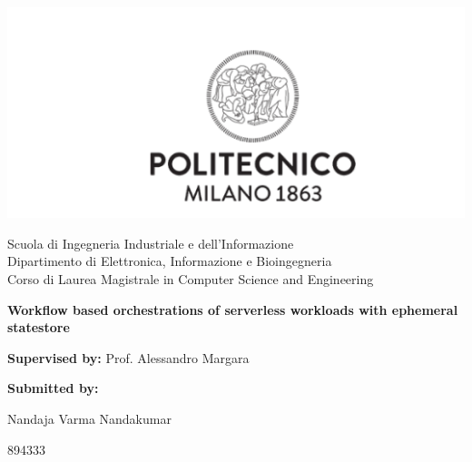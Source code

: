 \documentclass[12pt,titlepage]{article}
\date{\today}
\title{}
\begin{document}
\begin{titlepage}
   \begin{center}

       \includegraphics[width=1.0\textwidth]{./thesis_images/university.png}
            
       Scuola di Ingegneria Industriale e dell’Informazione\\
       Dipartimento di Elettronica, Informazione e Bioingegneria\\
       Corso di Laurea Magistrale in Computer Science and Engineering \\
       \date{\today}

            
            
       \vspace{2.8cm}
       \textbf{Workflow based orchestrations of serverless workloads with ephemeral statestore}

       \vspace{0.5cm}
            
       \vfill
       \vspace{1.5cm}

       \textbf{Supervised by:}
       Prof. Alessandro Margara

       \vspace{0.5cm}
       \textbf{Submitted by:}

       Nandaja Varma Nandakumar

       894333
   \end{center}
\end{titlepage}
\end{document}
